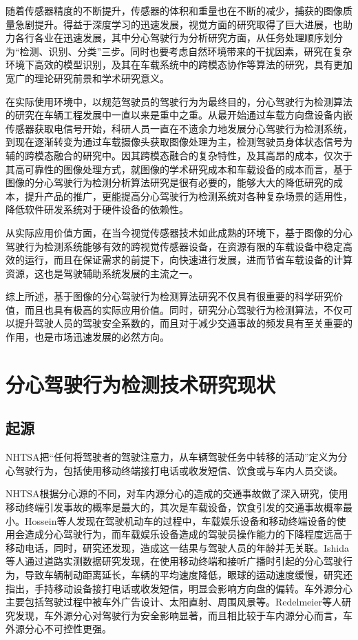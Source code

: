 随着传感器精度的不断提升，传感器的体积和重量也在不断的减少，捕获的图像质量急剧提升。得益于深度学习的迅速发展，视觉方面的研究取得了巨大进展，也助力各行各业在迅速发展，其中分心驾驶行为分析研究方面，从任务处理顺序划分为“检测、识别、分类”三步。同时也要考虑自然环境带来的干扰因素，研究在复杂环境下高效的模型识别，及其在车载系统中的跨模态协作等算法的研究，具有更加宽广的理论研究前景和学术研究意义。

在实际使用环境中，以规范驾驶员的驾驶行为为最终目的，分心驾驶行为检测算法的研究在车辆工程发展中一直以来是重中之重。从最开始通过车载方向盘设备内嵌传感器获取电信号开始，科研人员一直在不遗余力地发展分心驾驶行为检测系统，到现在逐渐转变为通过车载摄像头获取图像处理为主，检测驾驶员身体状态信号为辅的跨模态融合的研究中。因其跨模态融合的复杂特性，及其高昂的成本，仅次于其高可靠性的图像处理方式，就图像的学术研究成本和车载设备的成本而言，基于图像的分心驾驶行为检测分析算法研究是很有必要的，能够大大的降低研究的成本，提升产品的推广，更能提高分心驾驶行为检测系统对各种复杂场景的适用性，降低软件研发系统对于硬件设备的依赖性。

从实际应用价值方面，在当今视觉传感器技术如此成熟的环境下，基于图像的分心驾驶行为检测系统能够有效的跨视觉传感器设备，在资源有限的车载设备中稳定高效的运行，而且在保证需求的前提下，向快速进行发展，进而节省车载设备的计算资源，这也是驾驶辅助系统发展的主流之一。

综上所述，基于图像的分心驾驶行为检测算法研究不仅具有很重要的科学研究价值，而且也具有极高的实际应用价值。同时，研究分心驾驶行为检测算法，不仅可以提升驾驶人员的驾驶安全系数的，而且对于减少交通事故的频发具有至关重要的作用，也是市场迅速发展的必然方向。



\section{分心驾驶行为检测技术研究现状}

\subsection{起源}

NHTSA把“任何将驾驶者的驾驶注意力，从车辆驾驶任务中转移的活动”定义为分心驾驶行为，包括使用移动终端接打电话或收发短信、饮食或与车内人员交谈\cite{3}。

NHTSA根据分心源的不同，对车内源分心的造成的交通事故做了深入研究，使用移动终端引发事故的概率是最大的，其次是车载设备，饮食引发的交通事故概率最小\cite{1}。Hossein等人\cite{4}发现在驾驶机动车的过程中，车载娱乐设备和移动终端设备的使用会造成分心驾驶行为，而车载娱乐设备造成的驾驶员操作能力的下降程度远高于移动电话，同时，研究还发现，造成这一结果与驾驶人员的年龄并无关联。Ishida等人\cite{5}通过道路实测数据研究发现，在使用移动终端和接听广播时引起的分心驾驶行为，导致车辆制动距离延长，车辆的平均速度降低，眼球的运动速度缓慢，研究还指出，手持移动设备接打电话或收发短信，明显会影响方向盘的偏转。车外源分心主要包括驾驶过程中被车外广告设计、太阳直射、周围风景等。Redelmeier等人\cite{6}研究发现，车外源分心对驾驶行为安全影响显著，而且相比较于车内源分心而言，车外源分心不可控性更强。

